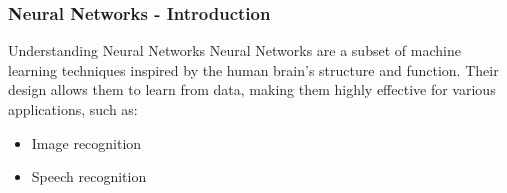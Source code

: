 \documentclass[aspectratio=169]{beamer}
\begin{document}
\begin{frame}[fragile]
    \frametitle{Neural Networks - Introduction}
    \begin{block}{Understanding Neural Networks}
        Neural Networks are a subset of machine learning techniques inspired by the human brain's structure and function. 
        Their design allows them to learn from data, making them highly effective for various applications, such as:
        \begin{itemize}
            \item Image recognition
            \item Speech recognition
        \end{itemize}
    \end{block}
\end{frame}
\end{document}
